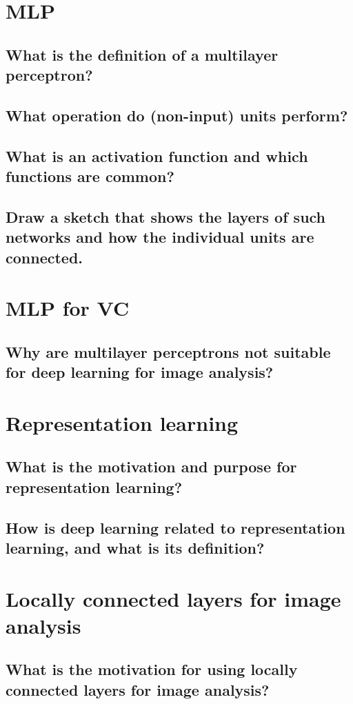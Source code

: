 \section{MLP}
\subsection{What is the definition of a multilayer perceptron?}
\subsection{What operation do (non-input) units perform?}
\subsection{What is an activation function and which functions are common?}
\subsection{Draw a sketch that shows the layers of such networks and how the individual units are connected.}

\section{MLP for VC}
\subsection{Why are multilayer perceptrons not suitable for deep learning for image analysis?}

\section{Representation learning}
\subsection{What is the motivation and purpose for representation learning?}
\subsection{How is deep learning related to representation learning, and what is its definition?}

\section{Locally connected layers for image analysis}
\subsection{What is the motivation for using locally connected layers for image analysis?}
